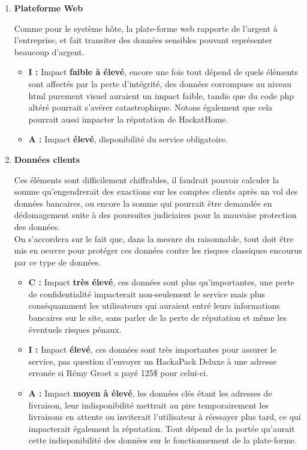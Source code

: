 \documentclass[a4paper,10pt,final,fleqn]{article}
\begin{document}
\begin{enumerate}
					\item \textbf{Plateforme Web}

						Comme pour le système hôte, la plate-forme web rapporte de l'argent à l'entreprise, et fait transiter des données sensibles pouvant représenter beaucoup d'argent.\\

						\begin{itemize}
							\item \textbf{I : } Impact \textbf{faible à élevé}, encore une fois tout dépend de quels éléments sont affectés par la perte d'intégrité, des données corrompues au niveau html purement visuel auraient un impact faible, tandis que du code php altéré pourrait s'avérer catastrophique. Notons également que cela pourrait aussi impacter la réputation de HackatHome.
							\item \textbf{A : } Impact \textbf{élevé}, disponibilité du service obligatoire.
						\end{itemize}

					\item \textbf{Données clients}

						Ces éléments sont difficilement chiffrables, il faudrait pouvoir calculer la somme qu'engendrerait des exactions sur les comptes clients après un vol des données bancaires, ou encore la somme qui pourrait être demandée en dédomagement suite à des poursuites judiciaires pour la mauvaise protection des données.\\
						On s'accordera sur le fait que, dans la mesure du raisonnable, tout doit être mis en oeuvre pour protéger ces données contre les risques classiques encourus par ce type de données.\\

						\begin{itemize}
							\item \textbf{C : } Impact \textbf{très élevé}, ces données sont plus qu'importantes, une perte de confidentialité impacterait non-seulement le service mais plus conséquamment les utilisateurs qui auraient entré leurs informations bancaires sur le site, sans parler de la perte de réputation et même les éventuels risques pénaux.
							\item \textbf{I : } Impact \textbf{élevé}, ces données sont très importantes pour assurer le service, pas question d'envoyer un HackaPack Deluxe à une adresse erronée si Rémy Groet a payé 125\$ pour celui-ci.
							\item \textbf{A : } Impact \textbf{moyen à élevé}, les données clés étant les adresses de livraison, leur indisponibilité mettrait au pire temporairement les livraisons en attente ou inviterait l'utilisateur à réessayer plus tard, ce qui impacterait également la réputation. Tout dépend de la portée qu'aurait cette indisponibilité des données sur le fonctionnement de la plate-forme.
						\end{itemize}



\end{enumerate}
\end{document}

